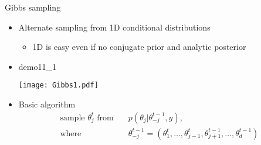 \documentclass[finnish,english,t]{beamer}
\begin{document}

\begin{frame}{Gibbs sampling}

  \begin{itemize}
  \item Alternate sampling from 1D conditional distributions
    \begin{itemize}
    \item 1D is easy even if no conjugate prior and analytic posterior
    \end{itemize}
  \item<2-> demo11\_1\\
    \vspace{-.5\baselineskip}
     \begin{center}
       \texttt{[image: Gibbs1.pdf]}
     \end{center}
    \vspace{-.5\baselineskip}
     \item<3-> Basic algorithm {
      \begin{align*}
         \text{sample $\theta_j^t$ from} \quad & p(\theta_j|\theta_{-j}^{t-1}, y),\\
      \text{where} \quad
        & \theta^{t-1}_{-j}= (\theta^t_1,\dots,\theta^t_{j-1},
        \theta^{t-1}_{j+1},\dots,\theta^{t-1}_d)
      \end{align*}
      }
  \end{itemize}

\end{frame}
\end{document}
